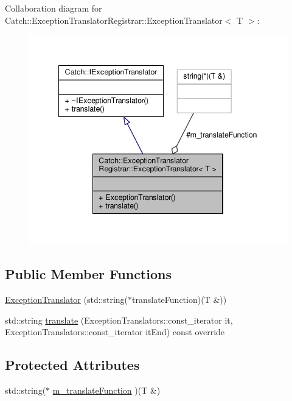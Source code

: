 Collaboration diagram for Catch\-:\-:Exception\-Translator\-Registrar\-:\-:Exception\-Translator$<$ T $>$\-:
\nopagebreak
\begin{figure}[H]
\begin{center}
\leavevmode
\includegraphics[width=343pt]{class_catch_1_1_exception_translator_registrar_1_1_exception_translator__coll__graph}
\end{center}
\end{figure}
\subsection*{Public Member Functions}
\begin{DoxyCompactItemize}
\item 
\hyperlink{class_catch_1_1_exception_translator_registrar_1_1_exception_translator_a2de4e9bcaad47996159763e69f614d7a}{Exception\-Translator} (std\-::string($\ast$translate\-Function)(T \&))
\item 
std\-::string \hyperlink{class_catch_1_1_exception_translator_registrar_1_1_exception_translator_a29e85940ee9ce719f26e43550cb4ed48}{translate} (Exception\-Translators\-::const\-\_\-iterator it, Exception\-Translators\-::const\-\_\-iterator it\-End) const override
\end{DoxyCompactItemize}
\subsection*{Protected Attributes}
\begin{DoxyCompactItemize}
\item 
std\-::string($\ast$ \hyperlink{class_catch_1_1_exception_translator_registrar_1_1_exception_translator_aa3d9238a0f9b3122a27ac1e60cb79ef9}{m\-\_\-translate\-Function} )(T \&)
\end{DoxyCompactItemize}


